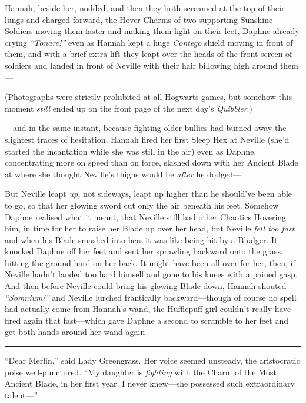 Hannah, beside her, nodded, and then they both screamed at the top of
their lungs and charged forward, the Hover Charms of two supporting
Sunshine Soldiers moving them faster and making them light on their
feet, Daphne already crying \emph{``Tonare!''} even as Hannah kept a
huge \emph{Contego} shield moving in front of them, and with a brief
extra lift they leapt over the heads of the front screen of soldiers and
landed in front of Neville with their hair billowing high around them---

(Photographs were strictly prohibited at all Hogwarts games, but somehow
this moment \emph{still} ended up on the front page of the next day's
\emph{Quibbler}.)

---and in the same instant, because fighting older bullies had burned
away the slightest traces of hesitation, Hannah fired her first Sleep
Hex at Neville (she'd started the incantation while she was still in the
air) even as Daphne, concentrating more on speed than on force, slashed
down with her Ancient Blade at where she thought Neville's thighs would
be \emph{after} he dodged---

But Neville leapt \emph{up,} not sideways, leapt up higher than he
should've been able to go, so that her glowing sword cut only the air
beneath his feet. Somehow Daphne realised what it meant, that Neville
still had other Chaotics Hovering him, in time for her to raise her
Blade up over her head, but Neville \emph{fell too fast} and when his
Blade smashed into hers it was like being hit by a Bludger. It knocked
Daphne off her feet and sent her sprawling backward onto the grass,
hitting the ground hard on her back. It might have been all over for
her, then, if Neville hadn't landed too hard himself and gone to his
knees with a pained gasp. And then before Neville could bring his
glowing Blade down, Hannah shouted \emph{``Somnium!''} and Neville
lurched frantically backward---though of course no spell had actually
come from Hannah's wand, the Hufflepuff girl couldn't really have fired
again that fast---which gave Daphne a second to scramble to her feet and
get both hands around her wand again---

\begin{center}\rule{3in}{0.4pt}\end{center}

``Dear Merlin,'' said Lady Greengrass. Her voice seemed unsteady, the
aristocratic poise well-punctured. ``My daughter is \emph{fighting} with
the Charm of the Most Ancient Blade, in her first year. I never
knew---she possessed such extraordinary talent---''

